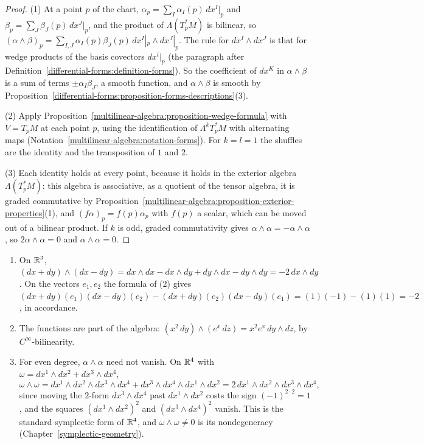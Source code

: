 \begin{proof}
(1) At a point $p$ of the chart, $\alpha_p = \sum_I\alpha_I(p)\,dx^I|_p$ and $\beta_p = \sum_J\beta_J(p)\,dx^J|_p$, and the product of $\Lambda(T_p^*M)$ is bilinear, so
$(\alpha \wedge \beta)_p = \sum_{I,J}\alpha_I(p)\beta_J(p)\,dx^I|_p \wedge dx^J|_p$. The rule for $dx^I \wedge dx^J$ is that for wedge products of the basis covectors $dx^i|_p$ (the paragraph after
Definition~\ref{differential-forms:definition-forms}). So the coefficient of $dx^K$ in $\alpha \wedge \beta$ is a sum of terms $\pm\alpha_I\beta_J$, a smooth function, and $\alpha \wedge \beta$ is smooth by
Proposition~\ref{differential-forms:proposition-forms-descriptions}(3).

(2) Apply Proposition~\ref{multilinear-algebra:proposition-wedge-formula} with $V = T_pM$ at each point $p$, using the identification of $\Lambda^kT_p^*M$ with alternating maps
(Notation~\ref{multilinear-algebra:notation-forms}). For $k = l = 1$ the shuffles are the identity and the transposition of $1$ and $2$.

(3) Each identity holds at every point, because it holds in the exterior algebra $\Lambda(T_p^*M)$: this algebra is associative, as a quotient of the tensor algebra, it is graded commutative by
Proposition~\ref{multilinear-algebra:proposition-exterior-properties}(1), and $(f\alpha)_p = f(p)\alpha_p$ with $f(p)$ a scalar, which can be moved out of a bilinear product. If $k$ is odd, graded commutativity gives
$\alpha \wedge \alpha = -\alpha \wedge \alpha$, so $2\alpha \wedge \alpha = 0$ and $\alpha \wedge \alpha = 0$.
\end{proof}

\begin{example}\label{differential-forms:example-wedge}
\begin{enumerate}
\item On $\mathbb{R}^3$, $(dx + dy) \wedge (dx - dy) = dx \wedge dx - dx \wedge dy + dy \wedge dx - dy \wedge dy = -2\,dx \wedge dy$. On the vectors $e_1, e_2$ the formula of (2) gives
$(dx + dy)(e_1)(dx - dy)(e_2) - (dx + dy)(e_2)(dx - dy)(e_1) = (1)(-1) - (1)(1) = -2$, in accordance.
\item The functions are part of the algebra: $(x^2\,dy) \wedge (e^x\,dz) = x^2e^x\,dy \wedge dz$, by $C^\infty$-bilinearity.
\item For even degree, $\alpha \wedge \alpha$ need not vanish. On $\mathbb{R}^4$ with $\omega = dx^1 \wedge dx^2 + dx^3 \wedge dx^4$,
\[
\omega \wedge \omega = dx^1 \wedge dx^2 \wedge dx^3 \wedge dx^4 + dx^3 \wedge dx^4 \wedge dx^1 \wedge dx^2 = 2\,dx^1 \wedge dx^2 \wedge dx^3 \wedge dx^4,
\]
since moving the $2$-form $dx^3 \wedge dx^4$ past $dx^1 \wedge dx^2$ costs the sign $(-1)^{2 \cdot 2} = 1$, and the squares $(dx^1 \wedge dx^2)^2$ and $(dx^3 \wedge dx^4)^2$ vanish. This is the standard symplectic form of
$\mathbb{R}^4$, and $\omega \wedge \omega \neq 0$ is its nondegeneracy (Chapter~\ref{symplectic-geometry}).
\end{enumerate}
\end{example}

